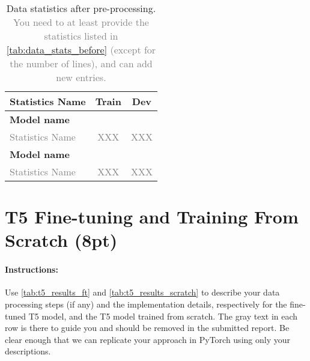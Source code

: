\documentclass{article}
\begin{document}
\begin{table}[h!]
\centering
\begin{tabular}{lcc}
\toprule
Statistics Name & Train & Dev \\
\midrule
\multicolumn{3}{l}{\textbf{Model name}} \\ %
\textcolor{gray}{Statistics Name} & \textcolor{gray}{XXX}& \textcolor{gray}{XXX} \\
\midrule
\multicolumn{3}{l}{\textbf{Model name}} \\ %
\textcolor{gray}{Statistics Name} & \textcolor{gray}{XXX}& \textcolor{gray}{XXX} \\
\bottomrule
\end{tabular}
\caption{Data statistics after pre-processing. \textcolor{gray}{You need to at least provide the statistics listed in \autoref{tab:data_stats_before} (except for the number of lines), and can add new entries.}}
\label{tab:data_stats_after}
\end{table}



\newpage




\section{T5 Fine-tuning and Training From Scratch (8pt)}\label{sec:t5}
\paragraph{Instructions:} Use \autoref{tab:t5_results_ft} and \autoref{tab:t5_results_scratch} to describe your data processing steps (if any) and the implementation details, respectively for the fine-tuned T5 model, and the T5 model trained from scratch.
The gray text in each row is there to guide you and should be removed in the submitted report. 
Be clear enough that we can replicate your approach in PyTorch using only your descriptions.
\end{document}
